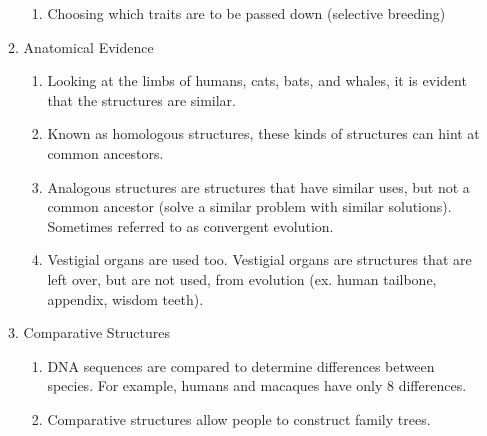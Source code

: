 \documentclass[12pt]{article}
\begin{document}
\begin{itemize}
\begin{enumerate}
\begin{enumerate}
          \item Choosing which traits are to be passed down (selective breeding)

        \end{enumerate}

      \item Anatomical Evidence

        \begin{enumerate}

          \item Looking at the limbs of humans, cats, bats, and whales, it is evident that the structures are similar.

          \item Known as homologous structures, these kinds of structures can hint at common ancestors.

          \item Analogous structures are structures that have similar uses, but not a common ancestor (solve a similar problem with similar solutions). Sometimes referred to as convergent evolution.

          \item Vestigial organs are used too. Vestigial organs are structures that are left over, but are not used, from evolution (ex. human tailbone, appendix, wisdom teeth).

        \end{enumerate}

      \item Comparative Structures

        \begin{enumerate}

          \item DNA sequences are compared to determine differences between species. For example, humans and macaques have only 8 differences.

          \item Comparative structures allow people to construct family trees.

        \end{enumerate}

    \end{enumerate}

\end{itemize}
\end{document}
